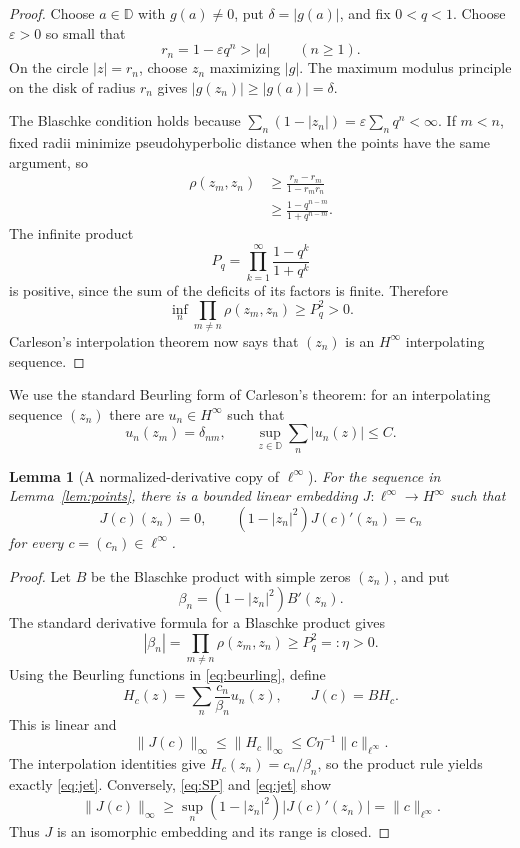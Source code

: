 \documentclass[11pt]{article}
\newtheorem{lemma}{Lemma}
\newcommand{\D}{\mathbb D}
\begin{document}
\begin{proof}
Choose $a\in\D$ with $g(a)\ne0$, put $\delta=|g(a)|$, and fix
$0<q<1$.  Choose $\varepsilon>0$ so small that
\[
 r_n=1-\varepsilon q^n>|a|\qquad(n\ge1).
\]
On the circle $|z|=r_n$, choose $z_n$ maximizing $|g|$.  The maximum
modulus principle on the disk of radius $r_n$ gives
$|g(z_n)|\ge |g(a)|=\delta$.

The Blaschke condition holds because
$\sum_n(1-|z_n|)=\varepsilon\sum_nq^n<\infty$.  If $m<n$, fixed radii
minimize pseudohyperbolic distance when the points have the same argument,
so
\begin{align*}
 \rho(z_m,z_n)
 &\ge \frac{r_n-r_m}{1-r_mr_n}\\
 &\ge \frac{1-q^{n-m}}{1+q^{n-m}}.
\end{align*}
The infinite product
\[
 P_q=\prod_{k=1}^\infty\frac{1-q^k}{1+q^k}
\]
is positive, since the sum of the deficits of its factors is finite.
Therefore
\[
 \inf_n\prod_{m\ne n}\rho(z_m,z_n)\ge P_q^2>0.
\]
Carleson's interpolation theorem now says that $(z_n)$ is an
$H^\infty$ interpolating sequence.
\end{proof}

We use the standard Beurling form of Carleson's theorem: for an interpolating
sequence $(z_n)$ there are $u_n\in H^\infty$ such that
\begin{equation}\label{eq:beurling}
 u_n(z_m)=\delta_{nm},
 \qquad
 \sup_{z\in\D}\sum_n|u_n(z)|\le C.
\end{equation}

\begin{lemma}[A normalized-derivative copy of $\ell^\infty$]
\label{lem:embedding}
For the sequence in Lemma~\ref{lem:points}, there is a bounded linear
embedding $J:\ell^\infty\to H^\infty$ such that
\begin{equation}\label{eq:jet}
 J(c)(z_n)=0,
 \qquad
 (1-|z_n|^2)J(c)'(z_n)=c_n
\end{equation}
for every $c=(c_n)\in\ell^\infty$.
\end{lemma}

\begin{proof}
Let $B$ be the Blaschke product with simple zeros $(z_n)$, and put
\[
 \beta_n=(1-|z_n|^2)B'(z_n).
\]
The standard derivative formula for a Blaschke product gives
\[
 |\beta_n|=\prod_{m\ne n}\rho(z_m,z_n)\ge P_q^2=:\eta>0.
\]
Using the Beurling functions in \eqref{eq:beurling}, define
\[
 H_c(z)=\sum_n\frac{c_n}{\beta_n}u_n(z),
 \qquad J(c)=BH_c.
\]
This is linear and
\[
 \|J(c)\|_\infty\le\|H_c\|_\infty
 \le C\eta^{-1}\|c\|_{\ell^\infty}.
\]
The interpolation identities give $H_c(z_n)=c_n/\beta_n$, so the product
rule yields exactly \eqref{eq:jet}.  Conversely, \eqref{eq:SP} and
\eqref{eq:jet} show
\[
 \|J(c)\|_\infty\ge\sup_n
 (1-|z_n|^2)|J(c)'(z_n)|=\|c\|_{\ell^\infty}.
\]
Thus $J$ is an isomorphic embedding and its range is closed.
\end{proof}
\end{document}
